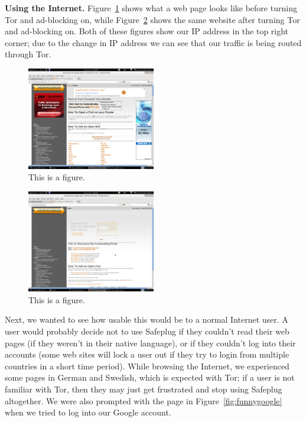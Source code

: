 {\bf Using the Internet.} Figure~\ref{fig:before} shows what a web page looks like before turning Tor and ad-blocking on, while Figure~\ref{fig:after} shows the same website after turning Tor and ad-blocking on.  Both of these figures show our IP address in the top right corner; due to the change in IP address we can see that our traffic is being routed through Tor.  

\begin{figure}[htb]
\begin{center}
\includegraphics[width=0.5\textwidth]{before}
\caption{This is a figure.}
\label{fig:before}
\end{center}
\end{figure}

\begin{figure}[htb]
\begin{center}
\includegraphics[width=0.5\textwidth]{after}
\caption{This is a figure.}
\label{fig:after}
\end{center}
\end{figure}

Next, we wanted to see how usable this would be to a normal Internet user.  A user would probably decide not to use Safeplug if they couldn't read their web pages (if they weren't in their native language), or if they couldn't log into their accounts (some web sites will lock a user out if they try to login from multiple countries in a short time period).  While browsing the Internet, we experienced some pages in German and Swedish, which is expected with Tor; if a user is not familiar with Tor, then they may just get frustrated and stop using Safeplug altogether.  We were also prompted with the page in Figure~\ref{fig:funnygoogle} when we tried to log into our Google account. 

